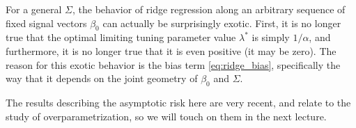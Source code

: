 \documentclass{article}
\begin{document}
For a general $\Sigma$, the behavior of ridge regression along an arbitrary
sequence of fixed signal vectors $\beta_0$ can actually be surprisingly
exotic. First, it is no longer true that the optimal limiting tuning parameter
value $\lambda^*$ is simply $1/\alpha$, and furthermore, it is no longer true
that it is even positive (it may be zero). The reason for this exotic behavior
is the bias term \eqref{eq:ridge_bias}, specifically the way that it depends on
the joint geometry of $\beta_0$ and $\Sigma$.

The results describing the asymptotic risk here are very recent, and relate to
the study of overparametrization, so we will touch on them in the next lecture. 



\end{document}
